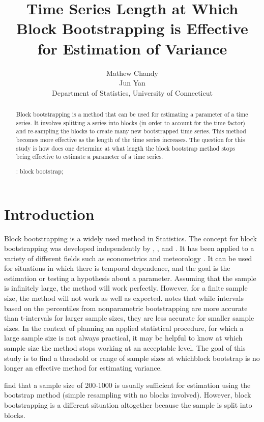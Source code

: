 \documentclass[12pt, letterpaper, titlepage]{article}
\title{Time Series Length at Which Block Bootstrapping is Effective for Estimation of Variance}
\author{Mathew Chandy\\
  Jun Yan\\[1ex]
  Department of Statistics, University of Connecticut\\
}
\date{}
\begin{document}
 
\maketitle

\doublespace

\begin{abstract}
Block bootstrapping is a method that can be used for estimating a parameter of a time
series. It involves splitting a series into blocks (in order to account for the time
factor) and re-sampling the blocks to create many new bootstrapped time series.
This method becomes more effective as the length of the time series increases. 
The question for this study is how does one determine at what length the block
bootstrap method stops being effective to estimate a parameter of a time
series.

\bigskip
\noindent{}:
block bootstrap;
\end{abstract}

\section{Introduction}
\label{sec:intro}

Block bootstrapping is a widely used method in Statistics. The concept for block 
bootstrapping was developed independently by \citet{hall1985resampling}, \citet{carlstein1986use}, and 
\citet{kunsch1989jackknife}. \citet{radovanov2014comparison} It has been applied to a variety of 
different fields such 
as econometrics \citep{mackinnon2006bootstrap} and meteorology \citep{varga2017generalised}. It can be used for 
situations in which there is temporal dependence, and the goal is the estimation or testing a hypothesis about a parameter. Assuming that the sample is infinitely 
large, the method will work perfectly. However, for a finite sample size, the method will 
not work as well as expected. \citet{hesterberg2015teachers} notes that while intervals based on the percentiles from nonparametric bootstrapping are more accurate than t-intervals for larger sample sizes, they are less accurate for smaller sample sizes. In the context of planning an applied 
statistical procedure, for which a large sample size is not always practical, it may be helpful to know at which sample size the method stops working at an acceptable level. 
The goal of this study is to find a threshold or range of sample sizes at whichblock bootstrap 
is no longer an effective method for estimating variance.

\citet{nevitt2001performance} find that a sample size of 200-1000 is usually sufficient for estimation using the bootstrap method (simple resampling with no blocks involved). However, block bootstrapping is a different situation altogether because the sample is split into blocks.
\end{document}
